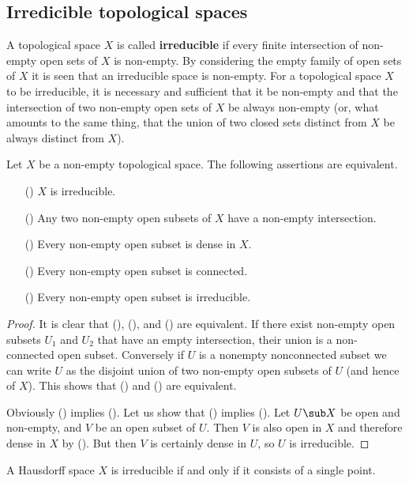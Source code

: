 \subsection{Irredicible topological spaces}
A topological space $X$ is called \textbf{irreducible} if every finite intersection of non-empty open sets of $X$ is non-empty. By considering the empty family of open sets of $X$ it is seen that an irreducible space is non-empty. For a topological space $X$ to be irreducible, it is necessary and sufficient that it be non-empty and that the intersection of two non-empty open sets of $X$ be always non-empty (or, what amounts to the same thing, that the union of two closed sets distinct from $X$ be always distinct from $X$).
\begin{proposition}\label{topo space irreducible iff}
Let $X$ be a non-empty topological space. The following assertions are
equivalent.
\begin{itemize}
\item[(\rmnum{1})] $X$ is irreducible.
\item[(\rmnum{2})] Any two non-empty open subsets of $X$ have a non-empty intersection.
\item[(\rmnum{3})] Every non-empty open subset is dense in $X$.
\item[(\rmnum{4})] Every non-empty open subset is connected.
\item[(\rmnum{5})] Every non-empty open subset is irreducible.
\end{itemize}
\end{proposition}
\begin{proof}
It is clear that (), (), and () are equivalent. If there exist non-empty open subsets $U_1$ and $U_2$ that have an empty intersection, their union is a non-connected open subset. Conversely if $U$ is a nonempty nonconnected subset we can write $U$ as the disjoint union of two non-empty open subsets of $U$ (and hence of $X$). This shows that () and () are equivalent.\par
Obviously () implies (). Let us show that () implies (). Let $U\sub X$ be open and non-empty, and $V$ be an open subset of $U$. Then $V$ is also open in $X$ and therefore dense in $X$ by (). But then $V$ is certainly dense in $U$, so $U$ is irreducible.
\end{proof}
\begin{example}
A Hausdorff space $X$ is irreducible if and only if it consists of a single point.
\end{example}
